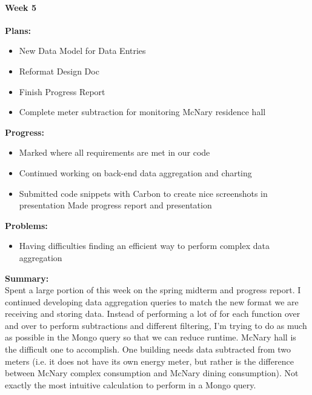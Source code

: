\paragraph{Week 5}
\begin{adjustwidth}{2.5em}{0pt}
    \vspace{-0.5cm}\textbf{Plans:}
    \vspace{-0.5cm}
    \begin{itemize}
        \item New Data Model for Data Entries
        \item Reformat Design Doc
        \item Finish Progress Report
        \item Complete meter subtraction for monitoring McNary residence hall
    \end{itemize} 
    \vspace{-0.3cm}\textbf{Progress:}
    \vspace{-0.5cm}
    \begin{itemize}
        \item Marked where all requirements are met in our code
        \item Continued working on back-end data aggregation and charting
        \item Submitted code snippets with Carbon to create nice screenshots in presentation
    Made progress report and presentation
    \end{itemize} 
    \vspace{-0.3cm}\textbf{Problems:}
    \vspace{-0.5cm}
    \begin{itemize}
        \item Having difficulties finding an efficient way to perform complex data aggregation
    \end{itemize}  
    \vspace{-0.3cm}\noindent\textbf{Summary:}\\
    \noindent Spent a large portion of this week on the spring midterm and progress report. I continued developing data aggregation queries to match the new format we are receiving and storing data. Instead of performing a lot of for each function over and over to perform subtractions and different filtering, I'm trying to do as much as possible in the Mongo query so that we can reduce runtime. McNary hall is the difficult one to accomplish. One building needs data subtracted from two meters (i.e. it does not have its own energy meter, but rather is the difference between McNary complex consumption and McNary dining consumption). Not exactly the most intuitive calculation to perform in a Mongo query.
\end{adjustwidth} 
